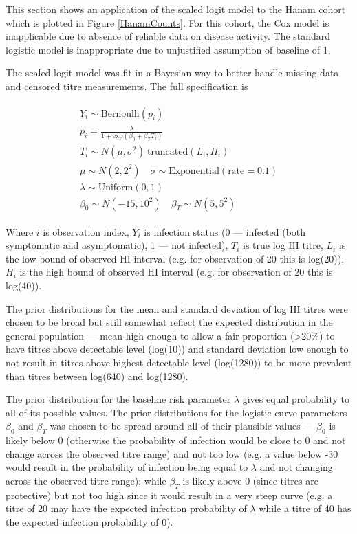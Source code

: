 \documentclass[12pt]{article}
\begin{document}
This section shows an application of the scaled logit model to the Hanam cohort which is plotted in Figure \ref{HanamCounts}. For this cohort, the Cox model is inapplicable due to absence of reliable data on disease activity. The standard logistic model is inappropriate due to unjustified assumption of baseline of 1.

The scaled logit model was fit in a Bayesian way to better handle missing data and censored titre measurements. The full specification is

\begin{align*}
\begin{gathered}
Y_i \sim \text{Bernoulli}(p_i) \\
p_i = \frac{\lambda}{1 + \text{exp}(\beta_0 + \beta_T T_i)} \\
T_i \sim N(\mu, \sigma^2) \ \text{truncated}(L_{i}, H_{i}) \\
\mu \sim N(2, 2^2) \quad \sigma \sim \text{Exponential}(\text{rate} = 0.1) \\
\lambda \sim \text{Uniform}(0, 1) \\
\beta_0 \sim N(-15, 10^2) \quad \beta_T \sim N(5, 5^2)
\end{gathered}
\end{align*}

Where $i$ is observation index, $Y_i$ is infection status (0 --- infected (both symptomatic and asymptomatic), 1 --- not infected), $T_i$ is true log HI titre, $L_i$ is the low bound of observed HI interval (e.g. for observation of 20 this is log(20)), $H_i$ is the high bound of observed HI interval (e.g. for observation of 20 this is log(40)).

The prior distributions for the mean and standard deviation of log HI titres were chosen to be broad but still somewhat reflect the expected distribution in the general population --- mean high enough to allow a fair proportion (>20\%) to have titres above detectable level (log(10)) and standard deviation low enough to not result in titres above highest detectable level (log(1280)) to be more prevalent than titres between log(640) and log(1280).

The prior distribution for the baseline risk parameter $\lambda$ gives equal probability to all of its possible values. The prior distributions for the logistic curve parameters $\beta_0$ and $\beta_T$ was chosen to be spread around all of their plausible values --- $\beta_0$ is likely below 0 (otherwise the probability of infection would be close to 0 and not change across the observed titre range) and not too low (e.g. a value below -30 would result in the probability of infection being equal to $\lambda$ and not changing across the observed titre range); while $\beta_T$ is likely above 0 (since titres are protective) but not too high since it would result in a very steep curve (e.g. a titre of 20 may have the expected infection probability of $\lambda$ while a titre of 40 has the expected infection probability of 0).
\end{document}

